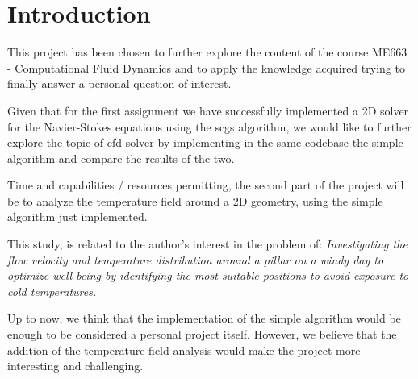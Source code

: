 \section{Introduction}

This project has been chosen to further explore the content of the course ME663 - Computational Fluid Dynamics and to apply the knowledge acquired trying to finally answer a personal question of interest.

Given that for the first assignment we have successfully implemented a 2D solver for the Navier-Stokes equations using the \acrshort{scgs} algorithm, we would like to further explore the topic of \acrshort{cfd} solver by implementing in the same codebase the \acrshort{simple} algorithm and compare the results of the two.

Time and capabilities / resources permitting, the second part of the project will be to analyze the temperature field around a 2D geometry, using the \acrshort{simple} algorithm just implemented.

This study, is related to the author's interest in the problem of: \emph{Investigating the flow velocity and temperature distribution around a pillar on a windy day to optimize well-being by identifying the most suitable positions to avoid exposure to cold temperatures.}

Up to now, we think that the implementation of the \acrshort{simple} algorithm would be enough to be considered a personal project itself.
However, we believe that the addition of the temperature field analysis would make the project more interesting and challenging.


